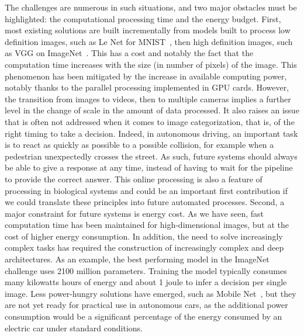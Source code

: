 \documentclass[default]{sn-jnl}%
\theoremstyle{thmstyleone}%
\theoremstyle{thmstyletwo}%
\theoremstyle{thmstylethree}%
\begin{document}
The challenges are numerous in such situations, and two major obstacles must be highlighted: the computational processing time and the energy budget. First, most existing solutions are built incrementally from models built to process low definition images, such as Le Net for MNIST~\citep{lecun_gradient-based_1998}, then high definition images, such as VGG on ImageNet~\citep{simonyan_very_2015}. This has a cost and notably the fact that the computation time increases with the size (in number of pixels) of the image. This phenomenon has been mitigated by the increase in available computing power, notably thanks to the parallel processing implemented in GPU cards. However, the transition from images to videos, then to multiple cameras implies a further level in the change of scale in the amount of data processed. It also raises an issue that is often not addressed when it comes to image categorization, that is, of the right timing to take a decision. Indeed, in autonomous driving, an important task is to react as quickly as possible to a possible collision, for example when a pedestrian unexpectedly crosses the street. As such, future systems should always be able to give a response at any time, instead of having to wait for the pipeline to provide the correct answer. This online processing is also a feature of processing in biological systems and could be an important first contribution if we could translate these principles into future automated processes. %
Second, a major constraint for future systems is energy cost. As we have seen, fast computation time has been maintained for high-dimensional images, but at the cost of higher energy consumption. In addition, the need to solve increasingly complex tasks has required the construction of increasingly complex and deep architectures. As an example, the best performing model in the ImageNet challenge uses 2100 million parameters. Training the model typically consumes many kilowatts hours of energy and about 1 joule to infer a decision per single image. Less power-hungry solutions have emerged, such as Mobile Net~\citep{howard_searching_2019}, but they are not yet ready for practical use in autonomous cars, as the additional power consumption would be a significant percentage of the energy consumed by an electric car under standard conditions.
\end{document}
